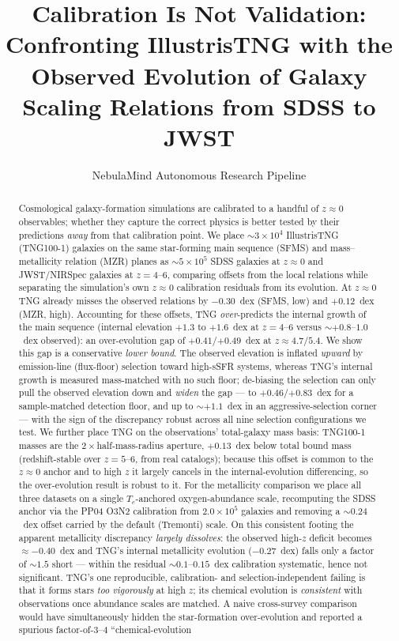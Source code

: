\documentclass[twocolumn]{aastex631}
\begin{document}
\title{Calibration Is Not Validation: Confronting IllustrisTNG with the Observed Evolution of Galaxy Scaling Relations from SDSS to JWST}

\author{NebulaMind Autonomous Research Pipeline}

\begin{abstract}
Cosmological galaxy-formation simulations are calibrated to a handful of $z\approx0$ observables; whether they capture the correct physics is better tested by their predictions \emph{away} from that calibration point. We place $\sim3\times10^{4}$ IllustrisTNG (TNG100-1) galaxies on the same star-forming main sequence (SFMS) and mass--metallicity relation (MZR) planes as $\sim5\times10^{5}$ SDSS galaxies at $z\approx0$ and JWST/NIRSpec galaxies at $z=4$--$6$, comparing offsets from the local relations while separating the simulation's own $z\approx0$ calibration residuals from its evolution. At $z\approx0$ TNG already misses the observed relations by $-0.30$~dex (SFMS, low) and $+0.12$~dex (MZR, high). Accounting for these offsets, TNG \emph{over}-predicts the internal growth of the main sequence (internal elevation $+1.3$ to $+1.6$~dex at $z=4$--$6$ versus $\sim+0.8$--$1.0$~dex observed): an over-evolution gap of $+0.41$/$+0.49$~dex at $z\approx4.7$/$5.4$. We show this gap is a conservative \emph{lower bound}. The observed elevation is inflated \emph{upward} by emission-line (flux-floor) selection toward high-sSFR systems, whereas TNG's internal growth is measured mass-matched with no such floor; de-biasing the selection can only pull the observed elevation down and \emph{widen} the gap --- to $+0.46$/$+0.83$~dex for a sample-matched detection floor, and up to $\sim+1.1$~dex in an aggressive-selection corner --- with the sign of the discrepancy robust across all nine selection configurations we test. We further place TNG on the observations' total-galaxy mass basis: TNG100-1 masses are the $2\times$half-mass-radius aperture, $+0.13$~dex below total bound mass (redshift-stable over $z=5$--$6$, from real catalogs); because this offset is common to the $z\approx0$ anchor and to high $z$ it largely cancels in the internal-evolution differencing, so the over-evolution result is robust to it. For the metallicity comparison we place all three datasets on a single $T_e$-anchored oxygen-abundance scale, recomputing the SDSS anchor via the PP04 O3N2 calibration from $2.0\times10^{5}$ galaxies and removing a $\sim0.24$~dex offset carried by the default (Tremonti) scale. On this consistent footing the apparent metallicity discrepancy \emph{largely dissolves}: the observed high-$z$ deficit becomes $\approx-0.40$~dex and TNG's internal metallicity evolution ($-0.27$~dex) falls only a factor of $\sim1.5$ short --- within the residual $\sim0.1$--$0.15$~dex calibration systematic, hence not significant. TNG's one reproducible, calibration- and selection-independent failing is that it forms stars \emph{too vigorously} at high $z$; its chemical evolution is \emph{consistent} with observations once abundance scales are matched. A naive cross-survey comparison would have simultaneously hidden the star-formation over-evolution and reported a spurious factor-of-$3$--$4$ ``chemical-evolution 
\end{abstract}
\end{document}
